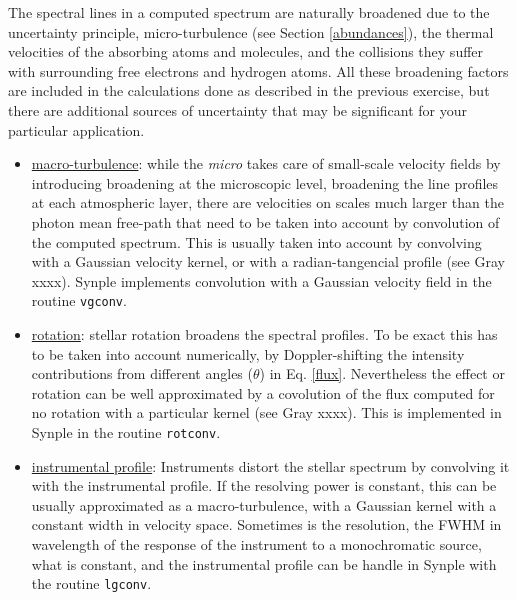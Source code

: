 \documentclass[]{article}
\begin{document}
The spectral lines in a computed spectrum are naturally broadened due to the uncertainty principle, micro-turbulence (see Section \ref{abundances}), the thermal velocities of the absorbing atoms and molecules, and the collisions they suffer with surrounding free electrons and hydrogen atoms.  All these broadening factors are included in the calculations done as described in the previous exercise, but there are additional sources of uncertainty that may be significant for your particular application.

\begin{itemize}
\item \underline{macro-turbulence}: while the {\it micro} takes care of small-scale velocity fields by introducing broadening at the microscopic level, broadening the line profiles at each atmospheric layer, there are velocities on scales much larger than the photon mean free-path that need to be taken into account by convolution of the computed spectrum. This is usually taken into account by convolving with a Gaussian velocity kernel, or with a radian-tangencial profile (see Gray xxxx). Synple implements convolution with a Gaussian velocity field in the routine {\tt vgconv}.
\item \underline{rotation}: stellar rotation broadens the spectral profiles. To be exact this has to be taken into account numerically, by Doppler-shifting the intensity contributions from different angles ($\theta$) in Eq. \ref{flux}. Nevertheless the effect or rotation can be well approximated by a covolution of the flux computed for no rotation with a particular kernel (see Gray xxxx). This is implemented in Synple in the routine {\tt rotconv}.
\item \underline{instrumental profile}: Instruments distort the stellar spectrum by convolving it with the instrumental profile. If the resolving power is constant, this can be usually approximated as a macro-turbulence, with a Gaussian kernel with a constant width in velocity space. Sometimes is the resolution, the FWHM in wavelength of the response of the instrument to a monochromatic source, what is constant, and the instrumental profile can be handle in Synple with the routine {\tt lgconv}.
\end{itemize}
\end{document}
